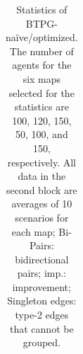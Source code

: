 \documentclass[letterpaper]{article} %
\theoremstyle{definition}
\begin{document}
\begin{table}[th!]
{\begin{tabular}{|c|c|c|c|c|c|c|c|c|c|c|c|c|}
   
    \end{tabular}}
    
   \caption{Statistics of BTPG-naïve/optimized. The number of agents for the six maps selected for the statistics are 100, 120, 150, 50, 100, and 150, respectively. All data in the second block are averages of 10 scenarios for each map; Bi-Pairs: bidirectional pairs; imp.: improvement; Singleton edges: type-2 edges that cannot be grouped. %
   }
   \label{tab:Statistics of BTPG-naive}
 \end{table}
\end{document}
